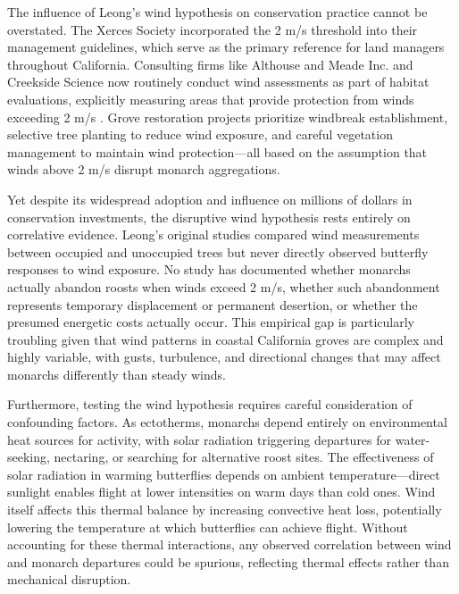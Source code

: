 The influence of Leong's wind hypothesis on conservation practice cannot be overstated. The Xerces Society incorporated the 2 m/s threshold into their management guidelines, which serve as the primary reference for land managers throughout California. %
Consulting firms like Althouse and Meade Inc. and Creekside Science now routinely conduct wind assessments as part of habitat evaluations, explicitly measuring areas that provide protection from winds exceeding 2 m/s \citep{althouse&meadeinc.EllwoodMesaSperling2023}. Grove restoration projects prioritize windbreak establishment, selective tree planting to reduce wind exposure, and careful vegetation management to maintain wind protection---all based on the assumption that winds above 2 m/s disrupt monarch aggregations.

Yet despite its widespread adoption and influence on millions of dollars in conservation investments, the disruptive wind hypothesis rests entirely on correlative evidence. Leong's original studies compared wind measurements between occupied and unoccupied trees but never directly observed butterfly responses to wind exposure. No study has documented whether monarchs actually abandon roosts when winds exceed 2 m/s, whether such abandonment represents temporary displacement or permanent desertion, or whether the presumed energetic costs actually occur. This empirical gap is particularly troubling given that wind patterns in coastal California groves are complex and highly variable, with gusts, turbulence, and directional changes that may affect monarchs differently than steady winds.

Furthermore, testing the wind hypothesis requires careful consideration of confounding factors. As ectotherms, monarchs depend entirely on environmental heat sources for activity, with solar radiation triggering departures for water-seeking, nectaring, or searching for alternative roost sites. The effectiveness of solar radiation in warming butterflies depends on ambient temperature---direct sunlight enables flight at lower intensities on warm days than cold ones. Wind itself affects this thermal balance by increasing convective heat loss, potentially lowering the temperature at which butterflies can achieve flight. Without accounting for these thermal interactions, any observed correlation between wind and monarch departures could be spurious, reflecting thermal effects rather than mechanical disruption.


